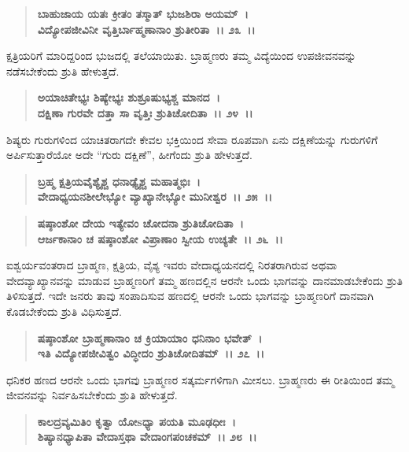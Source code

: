 \begin{verse}
\textbf{ಬಾಹುಜಾಯ ಯತಃ ಕ್ರೀತಂ ತಸ್ಮಾತ್ ಭುಜಶಿರಾ ಅಯಮ್~।}\\\textbf{ವಿದ್ಯೋಪಜೀವಿನೀ ವೃತ್ತಿರ್ಬಾಹ್ಮಣಾನಾಂ ಶ್ರುತೀರಿತಾ~।। ೨೩~।।}
\end{verse}

ಕ್ಷತ್ರಿಯರಿಗೆ ಮಾರಿದ್ದರಿಂದ ಭುಜದಲ್ಲಿ ತಲೆಯಾಯಿತು. ಬ್ರಾಹ್ಮಣರು ತಮ್ಮ ವಿದ್ಯೆಯಿಂದ ಉಪಜೀವನವನ್ನು ನಡೆಸಬೇಕೆಂದು ಶ್ರುತಿ ಹೇಳುತ್ತದೆ.

\begin{verse}
\textbf{ಅಯಾಚಿತೇಭ್ಯಃ ಶಿಷ್ಯೇಭ್ಯಃ ಶುಶ್ರೂಷುಭ್ಯಶ್ಚ ಮಾನದ~।}\\\textbf{ದಕ್ಷಿಣಾ ಗುರವೇ ದತ್ತಾ ಸಾ ವೃತ್ತಿಃ ಶ್ರುತಿಚೋದಿತಾ~।। ೨೪~।।}
\end{verse}

ಶಿಷ್ಯರು ಗುರುಗಳಿಂದ ಯಾಚಿತರಾಗದೇ ಕೇವಲ ಭಕ್ತಿಯಿಂದ ಸೇವಾ ರೂಪವಾಗಿ ಏನು ದಕ್ಷಿಣೆಯನ್ನು ಗುರುಗಳಿಗೆ ಅರ್ಪಿಸುತ್ತಾರೆಯೋ ಅದೇ “ಗುರು ದಕ್ಷಿಣೆ”, ಹೀಗೆಂದು ಶ್ರುತಿ ಹೇಳುತ್ತದೆ.

\begin{verse}
\textbf{ಬ್ರಹ್ಮ ಕ್ಷತ್ರಿಯವೈಶ್ಯೈಶ್ಚ ಧನಾಢ್ಯೈಶ್ಚ ಮಹಾತ್ಮಭಿಃ~।}\\\textbf{ವೇದಾಧ್ಯಯನಶೀಲೇಭ್ಯೋ ವ್ಯಾಖ್ಯಾನೇಭ್ಯೋ ಮುನೀಶ್ವರ~।। ೨೫~।।} 
\end{verse}

\begin{verse}
\textbf{ಷಷ್ಠಾಂಶೋ ದೇಯ ಇತ್ಯೇವಂ ಚೋದನಾ ಶ್ರುತಿಚೋದಿತಾ~।}\\\textbf{ಆರ್ಜಕಾನಾಂ ಚ ಷಷ್ಠಾಂಶೋ ವಿಪ್ರಾಣಾಂ ಸ್ವೀಯ ಉಚ್ಯತೇ~।। ೨೬~।।}
\end{verse}

ಐಶ್ವರ್ಯವಂತರಾದ ಬ್ರಾಹ್ಮಣ, ಕ್ಷತ್ರಿಯ, ವೈಶ್ಯ ಇವರು ವೇದಾಧ್ಯಯನದಲ್ಲಿ ನಿರತ\-ರಾಗಿರುವ ಅಥವಾ ವೇದವ್ಯಾಖ್ಯಾನವನ್ನು ಮಾಡುವ ಬ್ರಾಹ್ಮಣರಿಗೆ ತಮ್ಮ ಹಣದಲ್ಲಿನ ಆರನೇ ಒಂದು ಭಾಗವನ್ನು ದಾನಮಾಡಬೇಕೆಂದು ಶ್ರುತಿ ತಿಳಿಸುತ್ತದೆ. ಇದೇ ಜನರು ತಾವು ಸಂಪಾದಿಸುವ ಹಣದಲ್ಲಿ ಆರನೇ ಒಂದು ಭಾಗವನ್ನು ಬ್ರಾಹ್ಮಣರಿಗೆ ದಾನವಾಗಿ ಕೊಡಬೇಕೆಂದು ಶ್ರುತಿ ವಿಧಿಸುತ್ತದೆ.

\begin{verse}
\textbf{ಷಷ್ಠಾಂಶೋ ಬ್ರಾಹ್ಮಣಾನಾಂ ಚ ಕ್ರಿಯಾಯಾಂ ಧನಿನಾಂ ಭವೇತ್~।}\\\textbf{ಇತಿ ವಿದ್ಯೋಪಜೀವಿತ್ವಂ ವಿದ್ಧೀದಂ ಶ್ರುತಿಚೋದಿತಮ್~।। ೨೭~।।}
\end{verse}

ಧನಿಕರ ಹಣದ ಆರನೇ ಒಂದು ಭಾಗವು ಬ್ರಾಹ್ಮಣರ ಸತ್ಕರ್ಮಗಳಿಗಾಗಿ ಮೀಸಲು. ಬ್ರಾಹ್ಮಣರು ಈ ರೀತಿಯಿಂದ ತಮ್ಮ ಜೀವನವನ್ನು ನಿರ್ವಹಿಸಬೇಕೆಂದು ಶ್ರುತಿ ಹೇಳುತ್ತದೆ.

\begin{verse}
\textbf{ಕಾಲದ್ರವ್ಯಮಿತಿಂ ಕೃತ್ವಾ ಯೋsಧ್ಯಾ ಪಯತಿ ಮೂಢಧೀಃ~।}\\\textbf{ಶಿಷ್ಯಾನಧ್ಯಾಪಿತಾ ವೇದಾಸ್ತಥಾ ವೇದಾಂಗಪಂಚಕಮ್~।। ೨೮~।।}
\end{verse}

